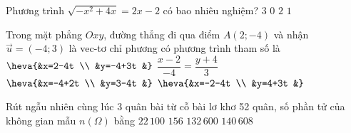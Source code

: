 \begin{ex}%
	Phương trình $\sqrt{-x^2+4x}=2x-2$ có bao nhiêu nghiệm?
	\choice
	{$3$}
	{$0$}
	{$2$}
	{\True $1$}
	\loigiai{}
\end{ex}
\begin{ex}%
	Trong mặt phẳng $Ox y$, đường thẳng đi qua điểm $A(2;-4)$ và nhận $\vec{u}=(-4; 3)$ là vec-tơ chỉ phương có phương trình tham số là
	\choice
	{\True $\heva{&x=2-4t \\
			&y=-4+3t
			&}$}
	{$\dfrac{x-2}{-4}=\dfrac{y+4}{3}$}
	{$\heva{&x=-4+2t \\
			&y=3-4t
			&}$}
	{$\heva{&x=-2-4t \\
			&y=4+3t
			&}$}
	\loigiai{}
\end{ex}
\begin{ex}%
	Rút ngẫu nhiên cùng lúc 3 quân bài từ cỗ bài lơ khơ 52 quân, số phần tử của không gian mẫu $n(\Omega)$ bằng
	\choice
	{\True $22\, 100$}
	{$156$}
	{$132\, 600$}
	{$140\, 608$}
	\loigiai{}
\end{ex}


